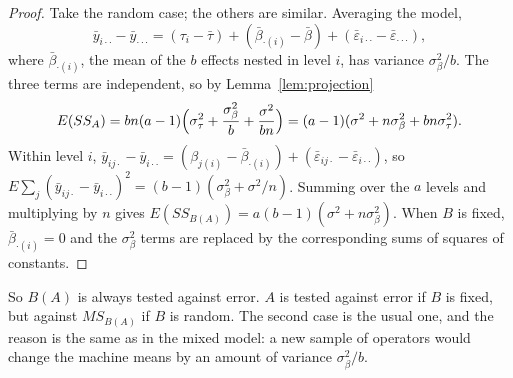 \documentclass[11pt,a4paper]{article}
\numberwithin{equation}{section}
\theoremstyle{definition}
\begin{document}
\begin{proof}
Take the random case; the others are similar. Averaging the model,
\[
\bar y_{i\cdot\cdot} - \bar y_{\cdot\cdot\cdot} = (\tau_i - \bar\tau) + (\bar\beta_{\cdot(i)} - \bar\beta) + (\bar\varepsilon_{i\cdot\cdot} - \bar\varepsilon_{\cdot\cdot\cdot}) ,
\]
where $\bar\beta_{\cdot(i)}$, the mean of the $b$ effects nested in level $i$, has variance $\sigma^2_\beta/b$. The three terms are independent, so by Lemma~\ref{lem:projection}
\[
E(SS_A) = bn(a - 1)\Bigl(\sigma^2_\tau + \frac{\sigma^2_\beta}b + \frac{\sigma^2}{bn}\Bigr) = (a - 1)(\sigma^2 + n\sigma^2_\beta + bn\sigma^2_\tau) .
\]
Within level $i$, $\bar y_{ij\cdot} - \bar y_{i\cdot\cdot} = (\beta_{j(i)} - \bar\beta_{\cdot(i)}) + (\bar\varepsilon_{ij\cdot} - \bar\varepsilon_{i\cdot\cdot})$, so $E\sum_j(\bar y_{ij\cdot} - \bar y_{i\cdot\cdot})^2 = (b - 1)(\sigma^2_\beta + \sigma^2/n)$. Summing over the $a$ levels and
multiplying by $n$ gives $E(SS_{B(A)}) = a(b - 1)(\sigma^2 + n\sigma^2_\beta)$. When $B$ is fixed, $\bar\beta_{\cdot(i)} = 0$ and the $\sigma^2_\beta$ terms are replaced by the corresponding sums of squares
of constants.
\end{proof}

So $B(A)$ is always tested against error. $A$ is tested against error if $B$ is fixed, but against $MS_{B(A)}$ if $B$ is random. The second case is the usual one,
and the reason is the same as in the mixed model: a new sample of operators would change the machine means by an amount of variance $\sigma^2_\beta/b$.
\end{document}

